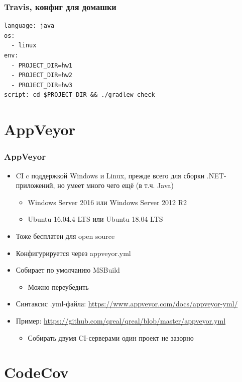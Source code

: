 \documentclass[xetex,mathserif,serif]{beamer}
\begin{document}
	\begin{frame}[fragile]
		\frametitle{Travis, конфиг для домашки}
		\begin{verbatim}
language: java
os:
  - linux
env:
  - PROJECT_DIR=hw1
  - PROJECT_DIR=hw2
  - PROJECT_DIR=hw3
script: cd $PROJECT_DIR && ./gradlew check
		\end{verbatim}
	\end{frame}

	\section{AppVeyor}

	\begin{frame}
		\frametitle{AppVeyor}
		\begin{itemize}
			\item CI c поддержкой Windows и Linux, прежде всего для сборки .NET-приложений, но умеет много чего ещё (в т.ч. Java)
			\begin{itemize}
				\item Windows Server 2016 или Windows Server 2012 R2
				\item Ubuntu 16.04.4 LTS или Ubuntu 18.04 LTS
			\end{itemize}
			\item Тоже бесплатен для open source
			\item Конфигурируется через appveyor.yml
			\item Собирает по умолчанию MSBuild
			\begin{itemize}
				\item Можно переубедить
			\end{itemize}
			\item Синтаксис .yml-файла: \url{https://www.appveyor.com/docs/appveyor-yml/}
			\item Пример: \url{https://github.com/qreal/qreal/blob/master/appveyor.yml}
			\begin{itemize}
				\item Собирать двумя CI-серверами один проект не зазорно
			\end{itemize}
		\end{itemize}
	\end{frame}

	\section{CodeCov}
\end{document}
